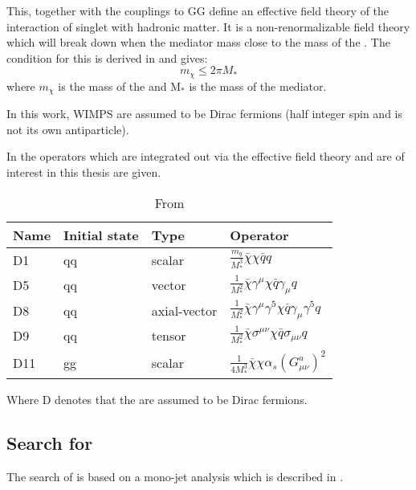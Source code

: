This, together with the couplings to GG define an effective field theory of the interaction of singlet \abbrWIMPS with hadronic matter. It is a non-renormalizable field theory which will break down when the mediator mass close to the mass of the \abbrWIMP .
The condition for this is derived in \citep{82.116010} and gives:
\begin{equation}
m_\chi \leqslant 2\pi M_*
\end{equation}
where $m_\chi$ is the mass of the \abbrWIMP and M$_*$ is the mass of the mediator. 

In this work, WIMPS are assumed to be Dirac fermions (half integer spin and is not its own antiparticle). 
 
In  the operators which are integrated out via the effective field theory and are of interest in this thesis are given.
\renewcommand{\arraystretch}{1.5} %
\begin{table}[H]
\begin{center}
    \begin{tabular}{ | l | l | l | l |}
    \hline
    Name & Initial state & Type & Operator \\ \hline
  	D1 & qq & scalar & $\frac{m_q}{M^3_*} \bar{\chi} \chi \bar{q} q$ \\ \hline
  	D5 & qq & vector & $\frac{1}{M^2_*} \bar{\chi} \gamma^\mu \chi \bar{q} \gamma_\mu q$ \\ \hline
  	D8 & qq & axial-vector & $\frac{1}{M^2_*}\bar{\chi}\gamma^\mu \gamma^5 \chi \bar{q} \gamma_\mu \gamma^5 q $ \\ \hline
  	D9 & qq & tensor & $\frac{1}{M^2_*} \bar{\chi}\sigma^{\mu \nu} \chi \bar{q} \sigma_{\mu \nu} q  $\\ \hline
  	D11 & gg & scalar & $\frac{1}{4M^3_*}\bar{\chi}\chi \alpha_s (G^a_{\mu \nu})^2 $\\ \hline
  	\end{tabular}

  	\caption{From \citep{CERN-PH-EP-2012-210}}
  	\label{tab:operators}
  	  	\end{center}
    \end{table}
\renewcommand{\arraystretch}{1.0}  %
Where D denotes that the \abbrWIMPS are assumed to be Dirac fermions.

\subsection{Search for \abbrWIMPS}
The search of \abbrWIMPS is based on a mono-jet analysis which is described in . 

